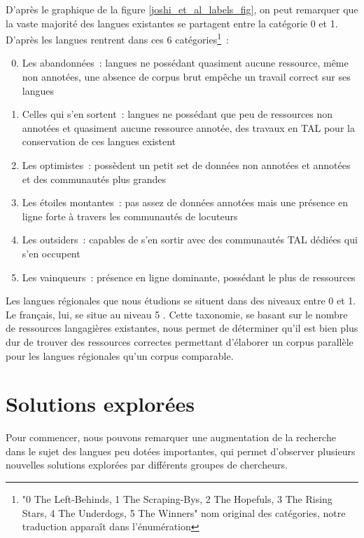 D'après le graphique de la figure \ref{joshi_et_al_labels_fig}, on peut remarquer que la vaste majorité des langues existantes se partagent
entre la catégorie 0 et 1. D'après \citet{joshi_2020} les langues rentrent dans ces
6 catégories\footnote{"0 The Left-Behinds, 1 The Scraping-Bys, 2 The Hopefuls, 3 The Rising Stars, 4 The Underdogs, 5 The Winners" nom original
des catégories, notre traduction apparaît dans l'énumération}~:
\begin{enumerate}
    \setcounter{enumi}{-1}
    \item Les abandonnées~: langues ne possédant quasiment aucune ressource, même non annotées, une absence de corpus brut empêche un
    travail correct sur ses langues
    \item Celles qui s'en sortent~: langues ne possédant que peu de ressources non annotées et quasiment aucune ressource annotée,
    des travaux en TAL pour la conservation de ces langues existent
    \item Les optimistes~: possèdent un petit set de données non annotées et annotées et des communautés plus grandes
    \item Les étoiles montantes~: pas assez de données annotées mais une présence en ligne forte à travers les communautés de locuteurs
    \item Les outsiders~: capables de s'en sortir avec des communautés TAL dédiées qui s'en occupent
    \item Les vainqueurs~: présence en ligne dominante, possédant le plus de ressources
\end{enumerate}
Les langues régionales que nous étudions se situent dans des niveaux entre 0 et 1.
Le français, lui, se situe au niveau 5 \citep{stosic_2024}. Cette taxonomie, se basant sur le nombre de ressources langagières
existantes, nous permet de déterminer qu'il est bien plus dur de trouver des ressources correctes permettant
d'élaborer un corpus parallèle pour les langues régionales qu'un corpus comparable.

\section{Solutions explorées}

Pour commencer, nous pouvons remarquer une augmentation de la recherche dans le sujet des langues peu
dotées importantes, qui permet d'observer plusieurs nouvelles solutions explorées par différents groupes de chercheurs.

\newpage


